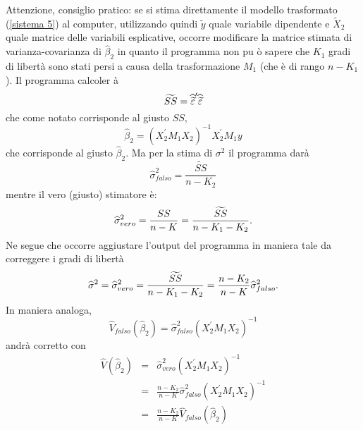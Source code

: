 \documentclass[a4paper]{report}
\theoremstyle{remark}
\begin{document}
\noindent Attenzione, consiglio pratico: se si stima direttamente il modello
trasformato (\ref{sistema 5}) al computer, utilizzando quindi $\widetilde{y}$
quale variabile dipendente e $\widetilde{X}_{2}$ quale matrice delle
variabili esplicative, occorre modificare la matrice stimata di
varianza-covarianza di $\widehat{\beta }_{2}$ in quanto il programma non pu%
\`{o} sapere che $K_{1}$ gradi di libert\`{a} sono stati persi a causa della
trasformazione $M_{1}$ (che \`{e} di rango $n-K_{1}$). Il programma calcoler%
\`{a} 
\begin{equation*}
\widetilde{SS}=\widehat{\widetilde{\varepsilon }}^{\prime }\widehat{%
\widetilde{\varepsilon }}
\end{equation*}%
che come notato corrisponde al giusto $SS$,%
\begin{equation*}
\widehat{\beta }_{2}=\left( X_{2}^{\prime }M_{1}X_{2}\right)
^{-1}X_{2}^{\prime }M_{1}y
\end{equation*}%
che corrisponde al giusto $\widehat{\beta }_{2}$. Ma per la stima di $\sigma
^{2}$ il programma dar\`{a}%
\begin{equation*}
\widehat{\sigma }_{falso}^{2}=\frac{\widetilde{SS}}{n-K_{2}}
\end{equation*}%
mentre il vero (giusto) stimatore \`{e}:%
\begin{equation*}
\widehat{\sigma }_{vero}^{2}=\frac{SS}{n-K}=\frac{\widetilde{SS}}{%
n-K_{1}-K_{2}}.
\end{equation*}%
Ne segue che occorre aggiustare l'output del programma in maniera tale da
correggere i gradi di libert\`{a}%
\begin{equation*}
\widehat{\sigma }^{2}=\widehat{\sigma }_{vero}^{2}=\frac{\widetilde{SS}}{%
n-K_{1}-K_{2}}=\frac{n-K_{2}}{n-K}\widehat{\sigma }_{falso}^{2}.
\end{equation*}%
In maniera analoga,%
\begin{equation*}
\widehat{V}_{falso}(\widehat{\beta }_{2})=\widehat{\sigma }%
_{falso}^{2}\left( X_{2}^{\prime }M_{1}X_{2}\right) ^{-1}
\end{equation*}%
andr\`{a} corretto con%
\begin{eqnarray*}
\widehat{V}(\widehat{\beta }_{2}) &=&\widehat{\sigma }_{vero}^{2}\left(
X_{2}^{\prime }M_{1}X_{2}\right) ^{-1} \\
&=&\frac{n-K_{2}}{n-K}\widehat{\sigma }_{falso}^{2}\left( X_{2}^{\prime
}M_{1}X_{2}\right) ^{-1} \\
&=&\frac{n-K_{2}}{n-K}\widehat{V}_{falso}(\widehat{\beta }_{2})
\end{eqnarray*}
\end{document}
